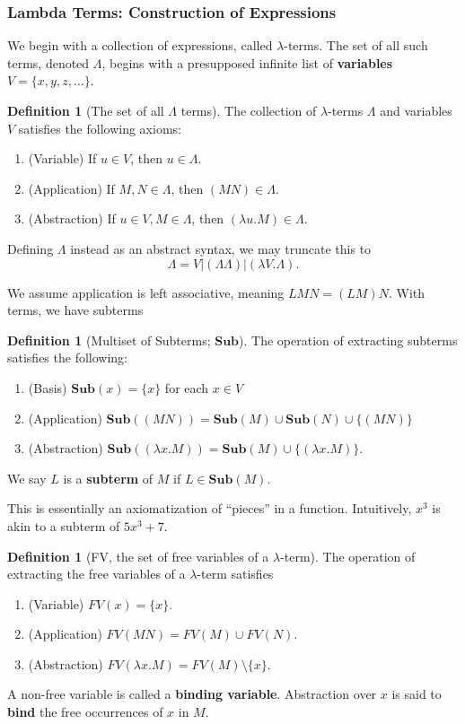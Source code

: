 \documentclass{article}
\theoremstyle{definition}
\newtheorem{definition} [theorem] {Definition}
\newcommand{\1}{\mathbb{1}}
\newcommand{\0}{\mathbb{0}}
\newcommand{\ty}{\mathbf}
\begin{document}
\subsubsection{Lambda Terms: Construction of Expressions}

We begin with a collection of expressions, called $\lambda$-terms. The set of all such terms, denoted $\Lambda$, begins with a presupposed infinite list of \textbf{variables} $V = \{x,y,z,\dots\}$.

\begin{definition}[The set of all $\Lambda$ terms] The collection of $\lambda$-terms $\Lambda$ and variables $V$ satisfies the following axioms:
    \begin{enumerate}
        \item (Variable) If $u \in V$, then $u \in \Lambda$.
        \item (Application) If $M,N \in \Lambda$, then $(MN) \in \Lambda$.
        \item (Abstraction) If $u \in V, M \in \Lambda$, then $(\lambda u. M) \in \Lambda$. 
    \end{enumerate}
Defining $\Lambda$ instead as an abstract syntax, we may truncate this to 
\[\Lambda = V|(\Lambda\Lambda)|(\lambda V.\Lambda).\]
\end{definition}

We assume application is left associative, meaning $LMN = (LM)N$. With terms, we have subterms

\begin{definition}[Multiset of Subterms; $\ty{Sub}$]
The operation of extracting subterms satisfies the following:
    \begin{enumerate}
        \item (Basis) $\ty{Sub}(x) = \{x\}$ for each $x \in V$ 
        \item (Application) $\ty{Sub}((MN)) = \ty{Sub}(M) \cup \ty{Sub}(N) \cup \{(MN)\}$ 
        \item (Abstraction) $\ty{Sub}((\lambda x. M)) = \ty{Sub}(M) \cup \{(\lambda x.M)\}$.
    \end{enumerate}
    We say $L$ is a \textbf{subterm} of $M$ if $L \in \ty{Sub}(M)$. 
\end{definition}

This is essentially an axiomatization of \enquote{pieces} in a function. Intuitively, $x^3$ is akin to a subterm of $5x^3 + 7$. 

\begin{definition}[FV, the set of free variables of a $\lambda$-term]
    The operation of extracting the free variables of a $\lambda$-term satisfies
\begin{enumerate}
    \item (Variable) $FV(x) = \{x\}$.
    \item (Application) $FV(MN) = FV(M) \cup FV(N)$.
    \item (Abstraction) $FV(\lambda x.M) = FV(M) \setminus \{x\}$. 
\end{enumerate}
    A non-free variable is called a \textbf{binding variable}. Abstraction over $x$ is said to \textbf{bind} the free occurrences of $x$ in $M$.
\end{definition}
\end{document}
